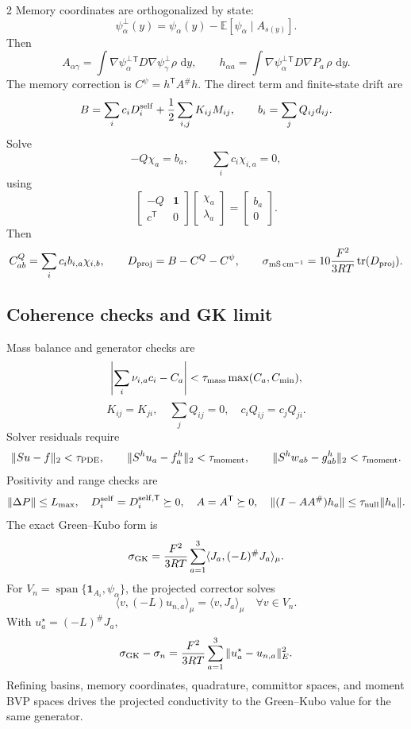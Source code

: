 \documentclass[10pt]{article}
\newcommand{\dd}{\,\mathrm d}
\newcommand{\T}{\mathsf{T}}
\newcommand{\tr}{\operatorname{tr}}
\newcommand{\mScm}{\mathrm{mS\,cm^{-1}}}
\newcommand{\one}{\mathbf{1}}
\begin{document}
\begin{multicols}{2}
Memory coordinates are orthogonalized by state:
\[
\psi_\alpha^\perp(y)
=
\psi_\alpha(y)-\mathbb E[\psi_\alpha\mid A_{s(y)}].
\]
Then
\[
A_{\alpha\gamma}
=
\int
\nabla\psi_\alpha^\perp{}^\T
D\nabla\psi_\gamma^\perp\rho\,\dd y,
\qquad
h_{\alpha a}
=
\int
\nabla\psi_\alpha^\perp{}^\T
D\nabla P_a\,\rho\,\dd y.
\]
The memory correction is \(C^\psi=h^\T A^\#h\). The direct term and
finite-state drift are
\[
B=\sum_i c_iD_i^{\rm self}
+\frac12\sum_{i,j}K_{ij}M_{ij},
\qquad
b_i=\sum_jQ_{ij}d_{ij}.
\]
Solve
\[
-Q\chi_a=b_a,
\qquad
\sum_ic_i\chi_{i,a}=0,
\]
using
\[
\begin{bmatrix}
-Q & \one\\
c^\T & 0
\end{bmatrix}
\begin{bmatrix}
\chi_a\\ \lambda_a
\end{bmatrix}
=
\begin{bmatrix}
b_a\\0
\end{bmatrix}.
\]
Then
\[
C^Q_{ab}=\sum_i c_i b_{i,a}\chi_{i,b},
\qquad
D_{\rm proj}=B-C^Q-C^\psi,
\qquad
\sigma_{\mScm}
=
10\frac{F^2}{3RT}\tr(D_{\rm proj}).
\]

\subsection{Coherence checks and GK limit}

Mass balance and generator checks are
\[
\left|\sum_i\nu_{i,a}c_i-C_a\right|
<
\tau_{\rm mass}\max(C_a,C_{\min}),
\]
\[
K_{ij}=K_{ji},
\quad
\sum_jQ_{ij}=0,
\quad
c_iQ_{ij}=c_jQ_{ji}.
\]
Solver residuals require
\[
\|Su-f\|_2<\tau_{\rm PDE},
\qquad
\|S^hu_a-f_a^h\|_2<\tau_{\rm moment},
\qquad
\|S^hw_{ab}-g_{ab}^h\|_2<\tau_{\rm moment}.
\]
Positivity and range checks are
\[
\|\Delta P\|\le L_{\max},
\quad
D_i^{\rm self}=D_i^{{\rm self},\T}\succeq0,
\quad
A=A^\T\succeq0,
\quad
\|(I-AA^\#)h_a\|\le\tau_{\rm null}\|h_a\|.
\]
The exact Green--Kubo form is
\[
\sigma_{\rm GK}
=
\frac{F^2}{3RT}
\sum_{a=1}^3
\langle J_a,(-L)^\#J_a\rangle_\mu.
\]
For \(V_n=\operatorname{span}\{\one_{A_i},\psi_\alpha\}\), the projected
corrector solves
\[
\langle v,(-L)u_{n,a}\rangle_\mu
=
\langle v,J_a\rangle_\mu
\quad
\forall v\in V_n.
\]
With \(u_a^\star=(-L)^\#J_a\),
\[
\sigma_{\rm GK}-\sigma_n
=
\frac{F^2}{3RT}
\sum_{a=1}^3
\|u_a^\star-u_{n,a}\|_E^2.
\]
Refining basins, memory coordinates, quadrature, committor spaces, and moment
BVP spaces drives the projected conductivity to the Green--Kubo value for the
same generator.


\end{multicols}
\end{document}
